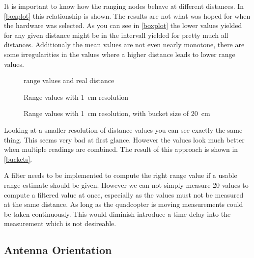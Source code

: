 It is important to know how the ranging nodes behave at different distances.
In \autoref{boxplot} this relationship is shown.
The results are not what was hoped for when the hardware was selected.
As you can see in \autoref{boxplot} the lower values yielded for any given distance might be in the intervall yielded for pretty much all distances.
Additionaly the mean values are not even nearly monotone, there are some irregularities in the values where a higher distance leads to lower range values.
\begin{landscape}
	\begin{figure}[h]
		\centering
		
		\caption{range values and real distance}
		\label{boxplot}
	\end{figure}

	\begin{figure}[h]
		\centering
		
		\caption{Range values with \SI{1}{\centi\metre} resolution}
		\label{resoulution}
	\end{figure}

	\begin{figure}[h]
		\centering
		
		\caption{Range values with \SI{1}{\centi\metre} resolution, with bucket size of \SI{20}{\centi\metre}}
		\label{buckets}
	\end{figure}
\end{landscape}

Looking at a smaller resolution of distance values you can see exactly the same thing.
This seems very bad at first glance.
However the values look much better when multiple readings are combined.
The result of this approach is shown in \autoref{buckets}.

A filter needs to be implemented to compute the right range value if a usable range estimate should be given.
However we can not simply measure 20 values to compute a filtered value at once, especially as the values must not be measured at the same distance.
As long as the quadcopter is moving measurements could be taken continuously.
This would diminish introduce a time delay into the measurement which is not desireable. 

\subsection{Antenna Orientation}



